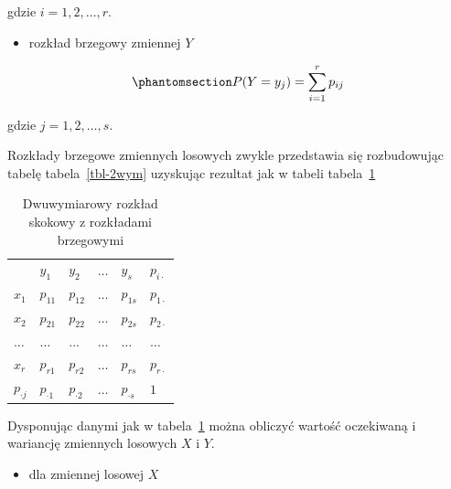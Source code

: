 \documentclass[
  letterpaper,
  DIV=11,
  numbers=noendperiod]{scrreprt}
\providecommand{\tightlist}{%
  \setlength{\itemsep}{0pt}\setlength{\parskip}{0pt}}\usepackage{longtable,booktabs,array}
\begin{document}
gdzie \(i = 1, 2, \ldots, r\).

\begin{itemize}
\tightlist
\item
  rozkład brzegowy zmiennej \(Y\)
\end{itemize}

\begin{equation}\phantomsection\label{eq-roz_war_sk2}{ P(Y=y_j)=\sum_{i=1}^rp_{ij}}\end{equation}

gdzie \(j = 1, 2, \ldots, s\).

Rozkłady brzegowe zmiennych losowych zwykle przedstawia się rozbudowując
tabelę tabela~\ref{tbl-2wym} uzyskując rezultat jak w tabeli
tabela~\ref{tbl-2wym1}

\begin{longtable}[]{@{}
  >{\raggedright\arraybackslash}p{}
  >{\raggedright\arraybackslash}p{}
  >{\raggedright\arraybackslash}p{}
  >{\raggedright\arraybackslash}p{}
  >{\raggedright\arraybackslash}p{}
  >{\raggedright\arraybackslash}p{}@{}}
\caption{Dwuwymiarowy rozkład skokowy z rozkładami
brzegowymi}\label{tbl-2wym1}\tabularnewline
\toprule\noalign{}
\endfirsthead
\endhead
\bottomrule\noalign{}
\endlastfoot
& \(y_1\) & \(y_2\) & \(\ldots\) & \(y_s\) & \(p_{i\cdot}\) \\
\(x_1\) & \(p_{11}\) & \(p_{12}\) & \(\ldots\) & \(p_{1s}\) &
\(p_{1\cdot}\) \\
\(x_2\) & \(p_{21}\) & \(p_{22}\) & \(\ldots\) & \(p_{2s}\) &
\(p_{2\cdot}\) \\
\(\ldots\) & \(\ldots\) & \(\ldots\) & \(\ldots\) & \(\ldots\) &
\(\ldots\) \\
\(x_r\) & \(p_{r1}\) & \(p_{r2}\) & \(\ldots\) & \(p_{rs}\) &
\(p_{r\cdot}\) \\
\(p_{\cdot j}\) & \(p_{\cdot 1}\) & \(p_{\cdot 2}\) & \(\ldots\) &
\(p_{\cdot s}\) & \(1\) \\
\end{longtable}

Dysponując danymi jak w tabela~\ref{tbl-2wym1} można obliczyć wartość
oczekiwaną i wariancję zmiennych losowych \(X\) i \(Y\).

\begin{itemize}
\tightlist
\item
  dla zmiennej losowej \(X\)
\end{itemize}
\end{document}
